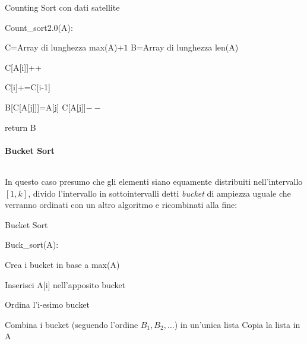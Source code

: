 \documentclass{article}
\begin{document}
\begin{algorithm}[ht]
\caption{Counting Sort con dati satellite}
\begin{algorithmic}
\State Count\_sort2.0(A):

    \State C=Array di lunghezza max(A)$+1$
    \State B=Array di lunghezza len(A)


        \State C[A[i]]++

    \EndFor


        \State C[i]+=C[i-1]

    \EndFor


        \State B[C[A[j]]]=A[j]
        \State C[A[j]]$--$

    \EndFor

\State return B

\end{algorithmic}
\end{algorithm}

\vspace{-15pt}

\paragraph{Bucket Sort} $\ $\newline

\noindent In questo caso presumo che gli elementi siano equamente distribuiti nell'intervallo $[1,k]$, divido l'intervallo in sottointervalli detti \textit{bucket} di ampiezza uguale che verranno ordinati con un altro algoritmo e ricombinati alla fine:

\begin{algorithm}[ht]
\caption{Bucket Sort}
\begin{algorithmic}
\State Buck\_sort(A):

    \State Crea i bucket in base a max(A) 


        \State Inserisci A[i] nell'apposito bucket 

    \EndFor


        \State Ordina l'i-esimo bucket

    \EndFor

    \State Combina i bucket (seguendo l'ordine $B_1,B_2,\ldots$) in un'unica lista
    \State Copia la lista in A

\end{algorithmic}
\end{algorithm}
\end{document}
